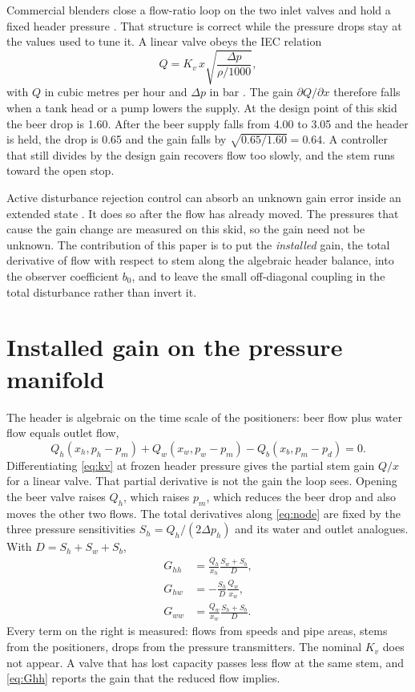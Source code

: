\documentclass[conference,a4paper]{IEEEtran}
\begin{document}
Commercial blenders close a flow-ratio loop on the two inlet valves and hold a fixed header pressure \cite{shinskey1996process,seborg2016process}. That structure is correct while the pressure drops stay at the values used to tune it. A linear valve obeys the IEC relation
\begin{equation}
\label{eq:kv}
Q = K_v\, x \sqrt{\frac{\Delta p}{\rho/1000}},
\end{equation}
with $Q$ in cubic metres per hour and $\Delta p$ in bar \cite{iec60534,fisher2005valve}. The gain $\partial Q/\partial x$ therefore falls when a tank head or a pump lowers the supply. At the design point of this skid the beer drop is \SI{1.60}{\barg}. After the beer supply falls from \SI{4.00}{\barg} to \SI{3.05}{\barg} and the header is held, the drop is \SI{0.65}{\barg} and the gain falls by $\sqrt{0.65/1.60}=0.64$. A controller that still divides by the design gain recovers flow too slowly, and the stem runs toward the open stop.

Active disturbance rejection control can absorb an unknown gain error inside an extended state \cite{han2009pid,gao2006paradigm,gao2014centrality}. It does so after the flow has already moved. The pressures that cause the gain change are measured on this skid, so the gain need not be unknown. The contribution of this paper is to put the \emph{installed} gain, the total derivative of flow with respect to stem along the algebraic header balance, into the observer coefficient $b_0$, and to leave the small off-diagonal coupling in the total disturbance rather than invert it.

\section{Installed gain on the pressure manifold}
The header is algebraic on the time scale of the positioners: beer flow plus water flow equals outlet flow,
\begin{equation}
\label{eq:node}
Q_h(x_h,p_h-p_m)+Q_w(x_w,p_w-p_m)-Q_b(x_b,p_m-p_d)=0.
\end{equation}
Differentiating \eqref{eq:kv} at frozen header pressure gives the partial stem gain $Q/x$ for a linear valve. That partial derivative is not the gain the loop sees. Opening the beer valve raises $Q_h$, which raises $p_m$, which reduces the beer drop and also moves the other two flows. The total derivatives along \eqref{eq:node} are fixed by the three pressure sensitivities $S_h=Q_h/(2\Delta p_h)$ and its water and outlet analogues. With $D=S_h+S_w+S_b$,
\begin{align}
G_{hh} &= \frac{Q_h}{x_h}\frac{S_w+S_b}{D}, \label{eq:Ghh}\\
G_{hw} &= -\frac{S_h}{D}\frac{Q_w}{x_w}, \label{eq:Ghw}\\
G_{ww} &= \frac{Q_w}{x_w}\frac{S_h+S_b}{D}. \label{eq:Gww}
\end{align}
Every term on the right is measured: flows from speeds and pipe areas, stems from the positioners, drops from the pressure transmitters. The nominal $K_v$ does not appear. A valve that has lost capacity passes less flow at the same stem, and \eqref{eq:Ghh} reports the gain that the reduced flow implies.
\end{document}
